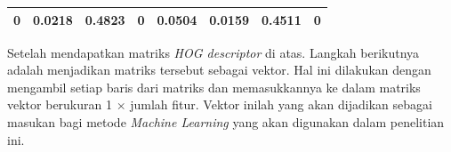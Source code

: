 \begin{enumerate}
\begin{table}[H]
\begin{small}
\begin{tabular}{|p{1cm}|p{1cm}|p{1cm}|p{1cm}|p{1cm}|p{1cm}|p{1cm}|p{1cm}|}
			\hline
			0 & 0.0218 & 0.4823 & 0 & 0.0504 & 0.0159 & 0.4511 & 0 \\
			\hline
		\end{tabular}
	\end{small}
	\label{fig:MatriksHasilNormalisasi}
\end{table}
Setelah mendapatkan matriks \textit{HOG descriptor} di atas. Langkah berikutnya adalah menjadikan matriks tersebut sebagai vektor. Hal ini dilakukan dengan mengambil setiap baris dari matriks dan memasukkannya ke dalam matriks vektor berukuran 1 $\times$ jumlah fitur. Vektor inilah yang akan dijadikan sebagai masukan bagi metode \textit{Machine Learning} yang akan digunakan dalam penelitian ini.\\
\end{enumerate}


